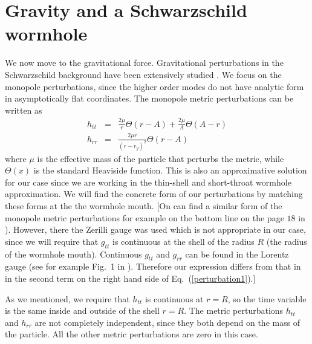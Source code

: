 \documentclass[prd, amsfonts, twocolumn, nofootinbib, showpacs]{revtex4}
\begin{document}
\section{ Gravity and a Schwarzschild wormhole}
We now move to the gravitational force.
Gravitational perturbations in the Schwarzschild background have been extensively studied \cite{1966PhRv..146..938P,Zerilli:1971wd,Garat:1999vr,Detweiler:2003ci,Barack:2005nr,Chen:2016plo}. We focus on the monopole perturbations, since the higher order modes do not have analytic form in asymptotically flat coordinates. The monopole metric perturbations can be written as
\begin{eqnarray}
\label{perturbation1}
h_{tt}&=&\frac{2\mu}{r}\Theta(r-A)+\frac{2\mu}{A}\Theta(A-r)\\
\label{perturbation2}
h_{rr}&=&\frac{2\mu r }{(r-r_g)^2}\Theta(r-A)
\end{eqnarray}
where $\mu$ is the effective mass of the particle that perturbs the metric, while $\Theta(x)$ is the standard Heaviside function.
This is also an approximative solution for our case since we are working in the thin-shell and short-throat wormhole approximation. We will find the concrete form of our perturbations by matching these forms at the the wormhole mouth.
[On can find a similar form of the monopole metric perturbations for example on the bottom line on the page $18$ in \cite{Chen:2016plo}). However, there the
Zerilli gauge was used which is not appropriate in our case, since we will require that $g_{tt}$ is continuous at the shell of the radius $R$ (the radius of the wormhole mouth). Continuous $g_{tt}$ and $g_{rr}$ can be found in the Lorentz gauge (see for example Fig.~1 in \cite{Barack:2005nr}). Therefore our expression differs from that in \cite{Chen:2016plo} in the second term on the right hand side of Eq.~(\ref{perturbation1}).]


 As we mentioned, we require that $h_{tt}$ is continuous at $r=R$, so the time variable is the same inside and outside of the shell $r=R$. The metric perturbations $h_{tt}$ and $h_{rr}$ are not completely independent, since they both depend on the mass of the particle.  All the other metric perturbations are zero in this case.
\end{document}
